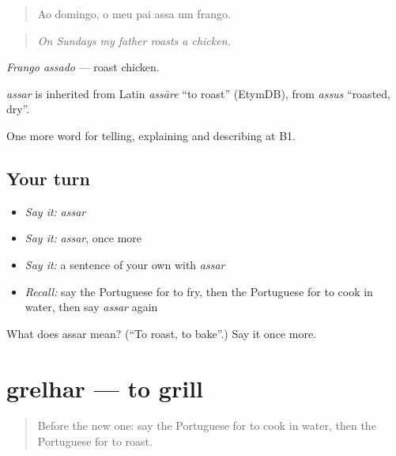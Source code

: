 \begin{quote}
Ao domingo, o meu pai assa um frango.
\end{quote}

\begin{quote}
\emph{On Sundays my father roasts a chicken.}
\end{quote}

\emph{Frango assado} — roast chicken.

\begin{cousinweb}
\emph{assar} is inherited from Latin \emph{assāre} \textquotedblleft{}to roast\textquotedblright{} (EtymDB), from \emph{assus} \textquotedblleft{}roasted, dry\textquotedblright{}.
\end{cousinweb}

\begin{grammarlens}[title={What you've built}]
One more word for telling, explaining and describing at B1.
\end{grammarlens}

\subsection*{Your turn}
\begin{itemize}
\raggedright
  \item \emph{Say it:} \emph{assar}
  \item \emph{Say it:} \emph{assar}, once more
  \item \emph{Say it:} a sentence of your own with \emph{assar}
  \item \emph{Recall:} say the Portuguese for to fry, then the Portuguese for to cook in water, then say \emph{assar} again
\end{itemize}

\begin{tcolorbox}[breakable,colback=teal!4,colframe=teal!35!black,title={Before you move on}]
What does assar mean? (\textquotedblleft{}To roast, to bake\textquotedblright{}.) Say it once more.
\end{tcolorbox}
\section[grelhar]{grelhar — to grill}

\label{lesson:PT-C332-grelhar}



\begin{quote}
Before the new one: say the Portuguese for to cook in water, then the Portuguese for to roast.
\end{quote}

